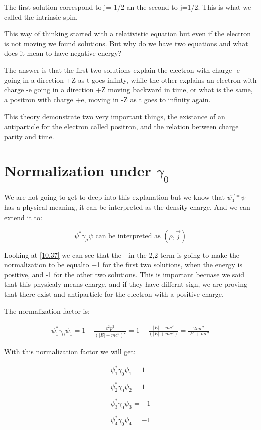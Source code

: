 The first solution correspond to j=-1/2 an the second to j=1/2. This is what we called the intrinsic spin.


This way of thinking started with a relativistic equation but even if the electron is not moving we found solutions. But why do we have two equations and what does it mean to have negative energy?

The answer is that the first two solutions explain the electron with charge -e going in a direction +Z as t goes infinty, while the other explains an electron with charge -e going in a direction +Z moving backward in time, or what is the same, a positron with charge +e, moving in -Z as t goes to infinity again.

This theory demonstrate two very important things, the existance of an antiparticle for the electron called positron, and the relation between charge parity and time.

\section{Normalization under $\gamma_0$}

We are not going to get to deep into this explanation but we know that $\psi^\omega_0*\psi$ has a physical meaning, it can be interpreted as the density charge. And we can extend it to:

\begin{equation}
  \psi^*\gamma_\mu \psi \text{ can be interpreted as } (\rho,\vec{j})
\end{equation}

Looking at \ref{10.37} we can see that the - in the 2,2 term is going to make the normalization to be equalto +1 for the first two solutions, when the energy is positive, and -1 for the other two solutions. This is important becuase we said that this physicaly means charge, and if they have differnt sign, we are proving that there exist and antiparticle for the electron with a positive charge.

The normalization factor is:

\begin{equation}
  \begin{array}{c}
    \psi_1^*\gamma_0\psi_1 = 1-\frac{c^2p^2}{(|E|+mc^2)^2} = 1-\frac{|E|-mc^2}{(|E|+mc^2)} = \frac{2mc^2}{|E|+mc^2}
  \end{array}
\end{equation}

With this normalization factor we will get:

\begin{equation}
  \begin{array}{c}
    \psi_1^*\gamma_0\psi_1 = 1
    \\

    \\
    \psi_2^*\gamma_0\psi_2 = 1
    \\

    \\
    \psi_3^*\gamma_0\psi_3 = -1
    \\

    \\
    \psi_4^*\gamma_0\psi_4 = -1
  \end{array}
\end{equation}
